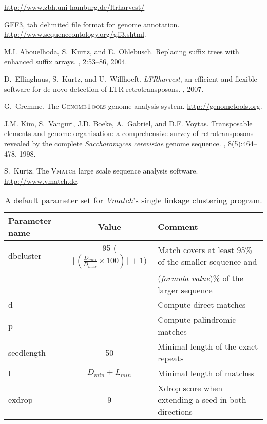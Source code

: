 \documentclass[12pt,titlepage]{article}
\newcommand{\LTRharvest}{\textit{LTRharvest}\xspace}
\begin{document}
%
%
\begin{thebibliography}{1}

  \url{http://www.zbh.uni-hamburg.de/ltrharvest/}

\textsc{GFF3}, tab delimited file format for genome annotation.
  \url{http://www.sequenceontology.org/gff3.shtml}.

M.I. Abouelhoda, S.~Kurtz, and E.~Ohlebusch.
\newblock Replacing suffix trees with enhanced suffix arrays.
, 2:53--86, 2004.

D.~Ellinghaus, S.~Kurtz, and U.~Willhoeft.
\newblock \LTRharvest, an efficient and flexible software for de novo
  detection of \normalsize{LTR} retrotransposons.
, 2007.

G.~Gremme.
\newblock The \textsc{GenomeTools} genome analysis system.
  \url{http://genometools.org}.

J.M. Kim, S.~Vanguri, J.D. Boeke, A.~Gabriel, and D.F. Voytas.
\newblock Transposable elements and genome organisation: a comprehensive survey
  of retrotransposons revealed by the complete \textit{Saccharomyces
  cerevisiae} genome sequence.
, 8(5):464--478, 1998.

S.~Kurtz.
\newblock The \textsc{Vmatch} large scale sequence analysis software.
  \url{http://www.vmatch.de}.

\end{thebibliography}

\begin{table}
\caption{A default parameter set for \textit{Vmatch}'s single linkage 
  clustering program.}
\vspace{0.25cm}
\begin{tabular}[h!]{lcl}\hline
Parameter name & Value & Comment\\\hline
dbcluster    & 95 ($\lfloor(\frac{D_{min}}{D_{max}} \times 100)\rfloor + 1$) & Match covers at least 95\% of the smaller sequence and\\
             &                                                 & (\textit{formula value})\% of the larger sequence\\
d  & & Compute direct matches\\
p & & Compute palindromic matches\\
seedlength & 50 & Minimal length of the exact repeats\\
l & $D_{min} + L_{min}$ & Minimal length of matches\\
exdrop & 9 & Xdrop score when extending a seed in both directions\\\hline
\end{tabular}
\label{parameters-cluster-default}
\end{table}
\end{document}
